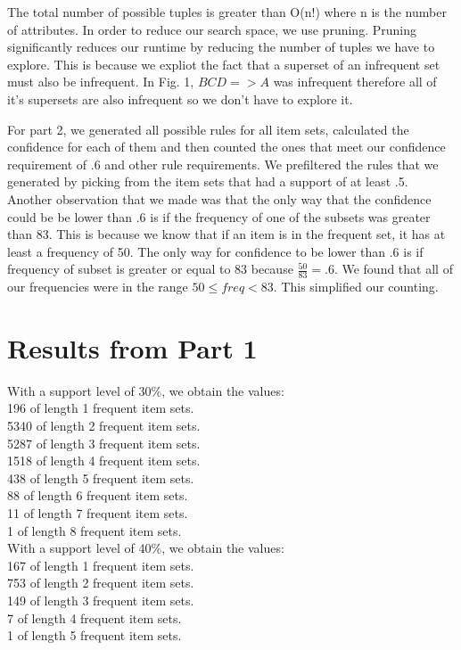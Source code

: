 \documentclass[12pt]{article}
\begin{document}
The total number of possible tuples is greater than O(n!) where n is the number of attributes. In order to reduce our search space, we use pruning.  Pruning significantly reduces our runtime by reducing the number of tuples we have to explore. This is because we expliot the fact that a superset of an infrequent set must also be infrequent. In Fig. 1, $BCD=>A$ was infrequent therefore all of it's supersets are also infrequent so we don't have to explore it. 

For part 2, we generated all possible rules for all item sets, calculated the confidence for each of them and then counted the ones that meet our confidence requirement of .6 and other rule requirements. We prefiltered the rules that we generated by picking from the item sets that had a support of at least .5. Another observation that we made was that the only way that the confidence could be be lower than .6 is if the frequency of one of the subsets was greater than 83. This is because we know that if an item is in the frequent set, it has at least a frequency of 50. The only way for confidence to be lower than .6 is if frequency of subset is greater or equal to 83 because $\frac{50}{83} = .6$. We found that all of our frequencies were in the range $50 \leq freq < 83$. This simplified our counting. 

\section*{Results from Part 1}
\noindent With a support level of 30\%, we obtain the values: \\
196 of length 1 frequent item sets. \\
5340 of length 2 frequent item sets. \\
5287 of length 3 frequent item sets. \\
1518 of length 4 frequent item sets.\\
438 of length 5 frequent item sets.\\
88 of length 6 frequent item sets.\\
11 of length 7 frequent item sets.\\
1 of length 8 frequent item sets.\\

\noindent With a support level of 40\%, we obtain the values: \\
167 of length 1 frequent item sets. \\
753 of length 2 frequent item sets. \\
149 of length 3 frequent item sets. \\
7 of length 4 frequent item sets.\\
1 of length 5 frequent item sets.\\
\end{document}
